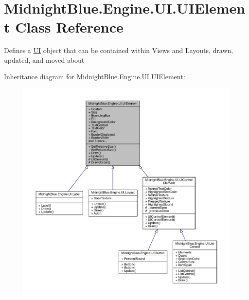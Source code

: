 \hypertarget{class_midnight_blue_1_1_engine_1_1_u_i_1_1_u_i_element}{}\section{Midnight\+Blue.\+Engine.\+U\+I.\+U\+I\+Element Class Reference}
\label{class_midnight_blue_1_1_engine_1_1_u_i_1_1_u_i_element}


Defines a \hyperlink{namespace_midnight_blue_1_1_engine_1_1_u_i}{UI} object that can be contained within Views and Layouts, drawn, updated, and moved about  




Inheritance diagram for Midnight\+Blue.\+Engine.\+U\+I.\+U\+I\+Element\+:
\nopagebreak
\begin{figure}[H]
\begin{center}
\leavevmode
\includegraphics[width=350pt]{class_midnight_blue_1_1_engine_1_1_u_i_1_1_u_i_element__inherit__graph}
\end{center}
\end{figure}


